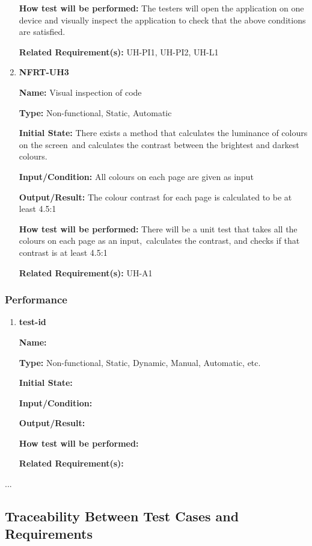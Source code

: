 \documentclass[12pt, titlepage]{article}
\begin{document}
\begin{enumerate}
\textbf{How test will be performed:} The testers will open the application on one device and visually inspect the application to check that the above conditions are satisfied.

\textbf{Related Requirement(s):} UH-PI1, UH-PI2, UH-L1

\item{\textbf{NFRT-UH3}}

\textbf{Name:} Visual inspection of code

\textbf{Type:} Non-functional, Static, Automatic
					
\textbf{Initial State:} There exists a method that calculates the luminance of colours on the screen\
and calculates the contrast between the brightest and darkest colours.

\textbf{Input/Condition:} All colours on each page are given as input

\textbf{Output/Result:} The colour contrast for each page is calculated to be at least 4.5:1

\textbf{How test will be performed:} There will be a unit test that takes all the colours on each page as an input,\
calculates the contrast, and checks if that contrast is at least 4.5:1

\textbf{Related Requirement(s):} UH-A1

\end{enumerate}

\subsubsection{Performance}

\begin{enumerate}
\item{\textbf{test-id}}

\textbf{Name:}
  
\textbf{Type:} Non-functional, Static, Dynamic, Manual, Automatic, etc.
            
\textbf{Initial State:}
  
\textbf{Input/Condition:}
            
\textbf{Output/Result:}
  
\textbf{How test will be performed:}
  
\textbf{Related Requirement(s):}
  
\end{enumerate}

...

\subsection{Traceability Between Test Cases and Requirements}
\end{document}

